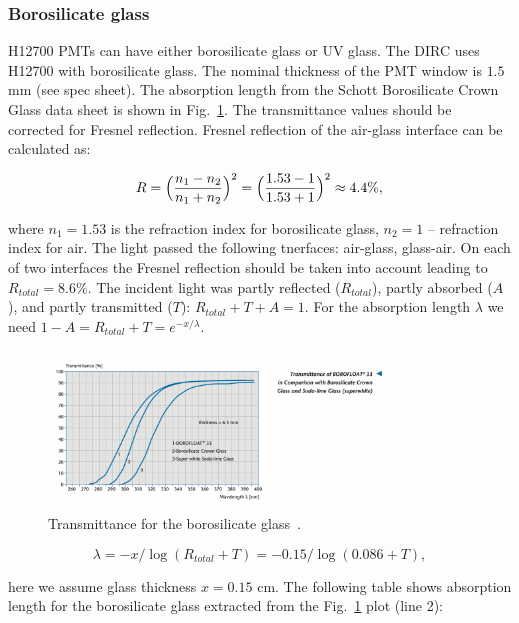 \subsubsection*{Borosilicate glass}

H12700 PMTs can have either borosilicate glass or UV glass. The \gluex DIRC uses H12700 with borosilicate glass. The nominal thickness of the PMT window is $1.5$ mm (see spec sheet). The absorption length from the Schott Borosilicate Crown Glass data sheet is shown in Fig.~\ref{pic:gla}. The transmittance values should be corrected for Fresnel reflection. Fresnel reflection of the air-glass interface can be calculated as:

\begin{equation}
R = \Bigl( \frac{n_1 - n_2}{n_1 + n_2} \Bigr)^{2} = \Bigl( \frac{1.53 - 1}{1.53 + 1} \Bigr) ^{2} \approx 4.4\%,
\label{eq:fre}
\end{equation}

\noindent where $n_1 = 1.53$ is the refraction index for borosilicate glass, $n_2 = 1$ -- refraction index for air. The light passed the following tnerfaces: air-glass, glass-air. On each of two interfaces the Fresnel reflection should be taken into account leading to $R_{total} = 8.6\%$. The incident light was partly reflected ($R_{total}$), partly absorbed ($A$), and partly transmitted ($T$): $ R_{total} + T + A = 1$. For the absorption length $\lambda$ we need $1 - A = R_{total} + T = e^{-x/\lambda}$. 

\begin{figure}[htb]
\centering
\includegraphics[angle=0,width=0.8\textwidth]{pics/glass.png}
\caption{\label{pic:gla}
Transmittance for the borosilicate glass~\cite{borospec}.
}
\end{figure}

\begin{equation}
\lambda = -x/\log(R_{total}+T) = -0.15/\log(0.086+T),
\label{eq:lam}
\end{equation}

\noindent here we assume glass thickness $x = 0.15$ cm. The following table shows absorption length for the borosilicate glass extracted from the Fig.~\ref{pic:gla} plot (line 2):

